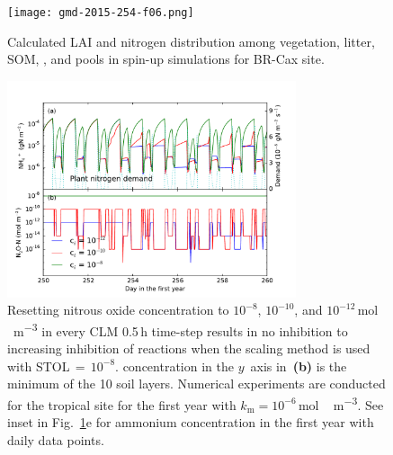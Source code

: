 \documentclass[gmd,noline]{copernicus}
\begin{document}
\begin{figure}
\texttt{[image: gmd-2015-254-f06.png]}
\caption{Calculated LAI and nitrogen distribution among vegetation, litter,
SOM, , and  pools in spin-up simulations for BR-Cax
site.} \label{fig:cax300yl}
\end{figure}

\begin{figure}[p]
\includegraphics[width=85mm]{gmd-2015-254-f07.pdf}
\caption{Resetting nitrous oxide concentration to $10^{-8}$, $10^{-10}$, and
$10^{-12}$\,\unit{mol\,m^{-3}} in every CLM 0.5\,h time-step results in no
inhibition to increasing inhibition of reactions when the scaling method is
used with STOL\,$=$\,$10^{-8}$.  concentration in the $y$~axis
in~\textbf{(b)} is the minimum of the 10 soil layers. Numerical experiments
are conducted for the tropical site for the first year with
$k_\mathrm{m}=10^{-6}$\,\unit{mol\,m^{-3}}. See inset in
Fig.~\ref{fig:cax300yl}e for ammonium concentration in the first year with
daily data points.} \label{fig:cax1yn2o}
\end{figure}
\end{document}
